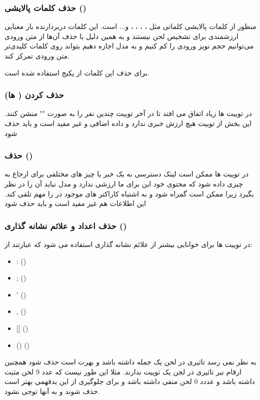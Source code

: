 {{{		}
		\subsubsection{\Large حذف کلمات پالایشی ()}
		{
			منظور از کلمات پالایشی کلماتی مثل 
			،
			،
			،
			،
			و... است.
			این کلمات دربردارنده بار معنایی ارزشمندی برای تشخیص لحن نیستند و به همین دلیل با حذف آن‌ها از متن ورودی می‌توانیم حجم نویز ورودی را کم کنیم و به مدل اجازه دهیم بتواند روی کلمات کلیدی‌تر متن ورودی تمرکز کند.
			
			برای حذف این کلمات از پکیج  استفاده شده است.
		}
		\subsubsection{\Large حذف کردن ( ها)}
		{
			در توییت ها زیاد اتفاق می افتد تا در آخر توییت چندین نفر را به صورت "" منشن کنند.
			این بخش از توییت هیچ ارزش خبری ندارد و داده اضافی و غیر مفید است و باید حذف شود
		}
		\subsubsection{\Large حذف ()}
		{
			در توییت ها ممکن است لینک دسترسی به یک خبر یا چیز های مختلفی برای ارجاع به چیزی داده شود که محتوی خود این 
			برای ما ارزشی ندارد و مدل نباید آن را در نظر بگیرد زیرا ممکن است گمراه شود و به اشتباه کاراکتر های موجود در
			را مهم تلقی کند. این اطلاعات هم غیر مفید است و باید حذف شود
		}
		\subsubsection{\Large حذف اعداد و علائم نشانه گذاری ()}
		{
			در توییت ها برای خوانایی بیشتر از علائم نشانه گذاری استفاده می شود که عبارتند از:
			\begin{itemize}
				\item : ()
				\item ; ()
				\item ' ()
				\item , ()
				\item {[]} ()
				\item () ()
			\end{itemize}
			به نظر نمی رسد تاثیری در لحن یک جمله داشته باشد و بهرت است حذف شود
			همچنین ارقام نیر تاثیری در لجن یک توییت ندارند. مثلا این طور نیست که عدد 9 لحن مثبت داشته باشد و عددد 0 لحن منفی داشته باشد و برای جلوگیری از این بدفهمی بهتر است حذف شوند و به آنها توجی نشود.
		}
}}
